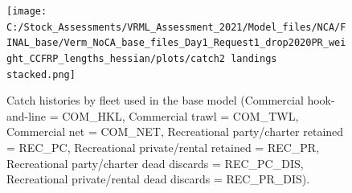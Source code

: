 \documentclass[11pt,
  english,
]{article}
\begin{document}
\FloatBarrier

\begin{figure}
\centering
\texttt{[image: C:/Stock\_Assessments/VRML\_Assessment\_2021/Model\_files/NCA/FINAL\_base/Verm\_NoCA\_base\_files\_Day1\_Request1\_drop2020PR\_weight\_CCFRP\_lengths\_hessian/plots/catch2 landings stacked.png]}
\caption{Catch histories by fleet used in the base model (Commercial hook-and-line = COM\_HKL, Commercial trawl = COM\_TWL, Commercial net = COM\_NET, Recreational party/charter retained = REC\_PC, Recreational private/rental retained = REC\_PR, Recreational party/charter dead discards = REC\_PC\_DIS, Recreational private/rental dead discards = REC\_PR\_DIS).\label{fig:catchES}}
\end{figure}

\begin{table}[H]


\end{table}
\end{document}
